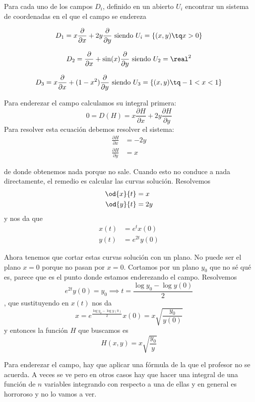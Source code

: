 \begin{problem}[5]
Para cada uno de los campos $D_i$, definido en un abierto $U_i$ encontrar un sistema de coordenadas en el que el campo se endereza

\ppart
\[D_1 = x \frac{\partial}{\partial x}+2y\frac{\partial}{\partial y} \text{ siendo } U_i=\{(x,y) \tq x > 0\}\]

\ppart
\[D_2 = \frac{\partial}{\partial x}+\sin(x)\frac{\partial}{\partial y} \text{ siendo } U_2 = \real^2\]

\ppart
\[D_3 = x\frac{\partial}{\partial x}+(1-x^2)\frac{\partial}{\partial y} \text{ siendo } U_3 = \{(x,y) \tq -1 < x < 1\}\]

\solution

\spart
Para enderezar el campo calculamos su integral primera:
\[0 = D(H) = x\frac{\partial H}{\partial x}+2y\frac{\partial H}{\partial y}\]
Para resolver esta ecuación debemos resolver el sistema:
\begin{align*}
\frac{\partial H}{\partial x} &= -2y\\
\frac{\partial H}{\partial y} &= x
\end{align*}

de donde obtenemos nada porque no sale. Cuando esto no conduce a nada directamente, el remedio es calcular las curvas solución. Resolvemos
\begin{align*}
\od{x}{t} &= x \\
\od{y}{t} &= 2y
\end{align*} y nos da que
\begin{align*}
x(t) &= e^t x(0) \\
y(t) &= e^{2t} y(0)
\end{align*}

Ahora tenemos que cortar estas curvas solución con un plano. No puede ser el plano $x = 0$ porque no pasan por $x = 0$. Cortamos por un plano $y_0$ que no sé qué es, parece que es el punto donde estamos enderezando el campo. Resolvemos
\[ e^{2t} y(0) = y_0 \implies t = \frac{\log y_0 - \log y(0)}{2} \], que sustituyendo en $x(t)$ nos da \[ x = e^{\frac{\log y_0 - \log y(0)}{2}} x(0) = x \sqrt{\frac{y_0}{y(0)}} \] y entonces la función $H$ que buscamos es \[ H(x,y) =  x \sqrt{\frac{y_0}{y}} \]

Para enderezar el campo, hay que aplicar una fórmula de la que el profesor no se acuerda. A veces se ve pero en otros casos hay que hacer una integral de una función de $n$ variables integrando con respecto a una de ellas y en general es horroroso y no lo vamos a ver.


\end{problem}
